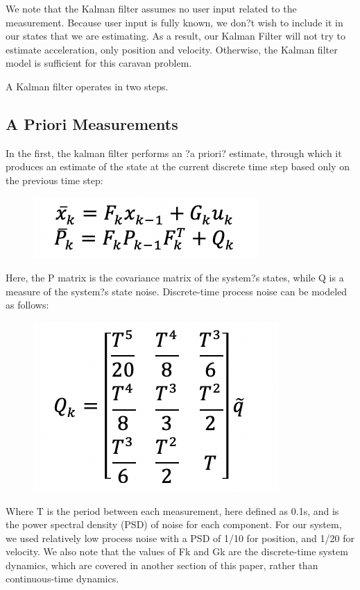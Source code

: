 \documentclass[12pt,onecolumn,reqno]{amsart}
\begin{document}
We note that the Kalman filter assumes no user input related to the measurement. Because user input is fully known, we don?t wish to include it in our states that we are estimating. As a result, our Kalman Filter will not try to estimate acceleration, only position and velocity. Otherwise, the Kalman filter model is sufficient for this caravan problem.

A Kalman filter operates in two steps. 

\subsection{A Priori Measurements}
In the first, the kalman filter performs an ?a priori? estimate, through which it produces an estimate of the state at the current discrete time step based only on the previous time step:

\begin{figure}[H]
	\includegraphics{a_priori.png}
	\label{fig:A Priori Estimate}
\end{figure}

Here, the P matrix is the covariance matrix of the system?s states, while Q is a measure of the system?s state noise. Discrete-time process noise can be modeled as follows:

\begin{figure}[H]
	\includegraphics{Q.png}
	\label{fig:Q Matrix}
\end{figure}

Where T is the period between each measurement, here defined as 0.1s, and  is the power spectral density (PSD) of noise for each component. For our system, we used relatively low process noise with a PSD of 1/10 for position, and 1/20 for velocity. We also note that the values of Fk and Gk are the discrete-time system dynamics, which are covered in another section of this paper, rather than continuous-time dynamics. 
\end{document}
